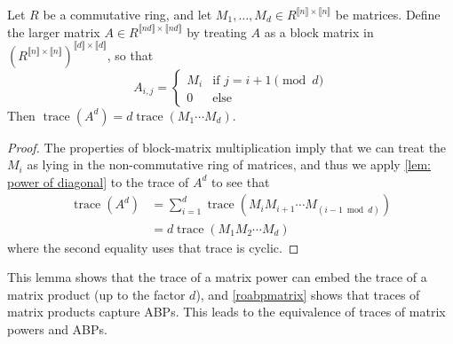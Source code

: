 \documentclass[letterpaper,11pt]{article}
\numberwithin{equation}{section}
\theoremstyle{plain}
\theoremstyle{remark}
\newcommand{\zr}[1]{{\llbracket {#1}\rrbracket}}
\DeclareMathOperator{\tr}{trace}
\begin{document}
\begin{corollary}\label{cor: trace of power}
	Let $R$ be a commutative ring, and let $M_1,\ldots,M_d\in R^{\zr{n}\times\zr{n}}$ be matrices.  Define the larger matrix $A\in R^{\zr{nd}\times\zr{nd}}$ by treating $A$ as a block matrix in $(R^{\zr{n}\times\zr{n}})^{\zr{d}\times\zr{d}}$, so that
	\[
		A_{i,j}=
			\begin{cases}
				M_i	&\text{if } j=i+1\pmod{d}\\
				0	&\text{else}
			\end{cases}
	\]
	Then $\tr(A^d)=d\tr(M_1\cdots M_d)$.
\end{corollary}
\begin{proof}
	The properties of block-matrix multiplication imply that we can treat the $M_i$ as lying in the non-commutative ring of matrices, and thus we apply \autoref{lem: power of diagonal} to the trace of $A^d$ to see that
	\begin{align*}
		\tr(A^d)
		&=\sum_{i=1}^d\tr(M_iM_{i+1}\cdots M_{(i-1\bmod{d})})\\
		&=d\tr(M_1M_2\cdots M_{d})
	\end{align*}
	where the second equality uses that trace is cyclic.
\end{proof}

This lemma shows that the trace of a matrix power can embed the trace of a matrix product (up to the factor $d$), and \autoref{roabpmatrix} shows that traces of matrix products capture ABPs.  This leads to the equivalence of traces of matrix powers and ABPs.
\end{document}
